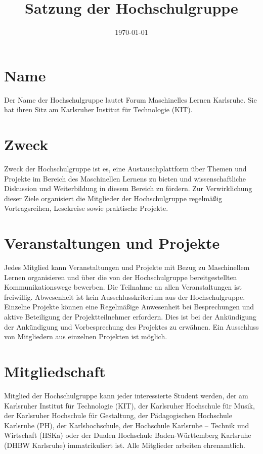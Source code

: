 \documentclass[a4paper, 11pt, parskip=no, headings=small]{scrartcl}
\title{Satzung der Hochschulgruppe \\ \qq{Forum Maschinelles Lernen Karlsruhe}}
\author{}
\date{\today}
\newcommand{\qq}[1]{\glqq{}#1\grqq{}}
\begin{document}
	
\maketitle

\section{Name}
Der Name der Hochschulgruppe lautet \qq{Forum Maschinelles Lernen Karlsruhe}. Sie hat ihren Sitz am Karlsruher Institut für Technologie (KIT).

\section{Zweck}
Zweck der Hochschulgruppe ist es, eine Austauschplattform über Themen und Projekte im Bereich des Maschinellen Lernens zu bieten und wissenschaftliche Diskussion und Weiterbildung in diesem Bereich zu fördern. Zur Verwirklichung dieser Ziele organisiert die Mitglieder der Hochschulgruppe regelmäßig Vortragsreihen, Lesekreise sowie praktische Projekte. 

\section{Veranstaltungen und Projekte}

Jedes Mitglied kann Veranstaltungen und Projekte mit Bezug zu Maschinellem Lernen organisieren und über die von der Hochschulgruppe bereitgestellten Kommunikationswege bewerben. Die Teilnahme an allen Veranstaltungen ist freiwillig. Abwesenheit ist kein Ausschlusskriterium aus der Hochschulgruppe. Einzelne Projekte können eine Regelmäßige Anwesenheit bei Besprechungen und aktive Beteiligung der Projektteilnehmer erfordern. Dies ist bei der Ankündigung der Ankündigung und Vorbesprechung des Projektes zu erwähnen. Ein Ausschluss von Mitgliedern aus einzelnen Projekten ist möglich.

\section{Mitgliedschaft}
Mitglied der Hochschulgruppe kann jeder interessierte Student werden, der am Karlsruher Institut für Technologie (KIT), der Karlsruher Hochschule für Musik, der Karlsruher Hochschule für Gestaltung, der Pädagogischen Hochschule Karlsruhe (PH), der Karlshochschule, der Hochschule Karlsruhe – Technik und Wirtschaft (HSKa) oder der Dualen Hochschule Baden-Württemberg Karlsruhe (DHBW Karlsruhe) immatrikuliert ist. Alle Mitglieder arbeiten ehrenamtlich.
\end{document}
